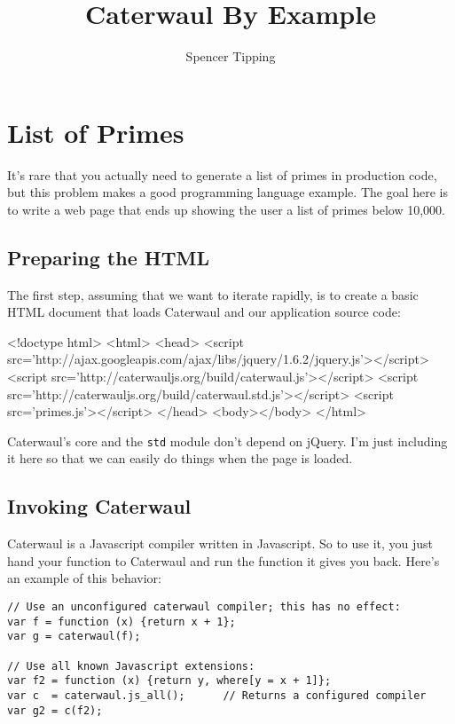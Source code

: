 \documentclass{report}
\title{Caterwaul By Example}
\author{Spencer Tipping}
\begin{document}
\maketitle{}
\tableofcontents{}

\chapter{List of Primes}\label{sec:list-of-primes}
  It's rare that you actually need to generate a list of primes in production code, but this problem makes a good programming language example. The goal here is to write a web page that ends
  up showing the user a list of primes below 10,000.

\section{Preparing the HTML}
    The first step, assuming that we want to iterate rapidly, is to create a basic HTML document that loads Caterwaul and our application source code:

\begin{resourcecode}
<!doctype html>
<html>
  <head>
  <script src='http://ajax.googleapis.com/ajax/libs/jquery/1.6.2/jquery.js'></script>
  <script src='http://caterwauljs.org/build/caterwaul.js'></script>
  <script src='http://caterwauljs.org/build/caterwaul.std.js'></script>
  <script src='primes.js'></script>
  </head>
  <body></body>
</html> \end{resourcecode}

    Caterwaul's core and the {\tt std} module don't depend on jQuery. I'm just including it here so that we can easily do things when the page is loaded.

\section{Invoking Caterwaul}
    Caterwaul is a Javascript compiler written in Javascript. So to use it, you just hand your function to Caterwaul and run the function it gives you back. Here's an example of this behavior:

\begin{verbatim}
// Use an unconfigured caterwaul compiler; this has no effect:
var f = function (x) {return x + 1};
var g = caterwaul(f);

// Use all known Javascript extensions:
var f2 = function (x) {return y, where[y = x + 1]};
var c  = caterwaul.js_all();      // Returns a configured compiler
var g2 = c(f2);
\end{verbatim}
\end{document}
